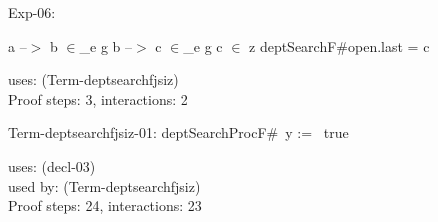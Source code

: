 \documentclass[a4paper]{article}
\begin{document}
\medskip

Exp-06: 
\begin{flushleft}


\Fol

a --$>$ b $\in$\_e g \And b --$>$ c $\in$\_e g \And c $\in$ z \Imp \Do deptSearchF\#\Dc open.last = c

\end{flushleft}


uses: (Term-deptsearchfjsiz)\\
Proof steps: 3, interactions: 2

\medskip

Term-deptsearchfjsiz-01: 
 \Fol \Do deptSearchProcF\#\Dc\ \Do y := \Dc\ true


uses: (decl-03)\\
used by: (Term-deptsearchfjsiz)\\
Proof steps: 24, interactions: 23

\medskip
\end{document}
